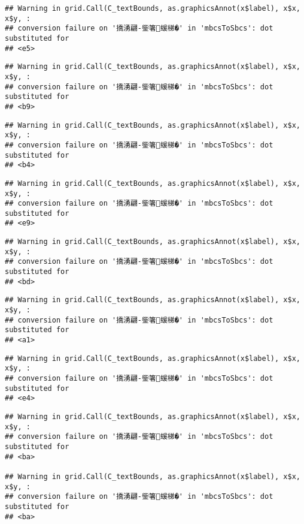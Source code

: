 \documentclass[
]{article}
\begin{document}
\begin{verbatim}
## Warning in grid.Call(C_textBounds, as.graphicsAnnot(x$label), x$x, x$y, :
## conversion failure on '撟湧翩-鈭箸蝯梯�' in 'mbcsToSbcs': dot substituted for
## <e5>
\end{verbatim}

\begin{verbatim}
## Warning in grid.Call(C_textBounds, as.graphicsAnnot(x$label), x$x, x$y, :
## conversion failure on '撟湧翩-鈭箸蝯梯�' in 'mbcsToSbcs': dot substituted for
## <b9>
\end{verbatim}

\begin{verbatim}
## Warning in grid.Call(C_textBounds, as.graphicsAnnot(x$label), x$x, x$y, :
## conversion failure on '撟湧翩-鈭箸蝯梯�' in 'mbcsToSbcs': dot substituted for
## <b4>
\end{verbatim}

\begin{verbatim}
## Warning in grid.Call(C_textBounds, as.graphicsAnnot(x$label), x$x, x$y, :
## conversion failure on '撟湧翩-鈭箸蝯梯�' in 'mbcsToSbcs': dot substituted for
## <e9>
\end{verbatim}

\begin{verbatim}
## Warning in grid.Call(C_textBounds, as.graphicsAnnot(x$label), x$x, x$y, :
## conversion failure on '撟湧翩-鈭箸蝯梯�' in 'mbcsToSbcs': dot substituted for
## <bd>
\end{verbatim}

\begin{verbatim}
## Warning in grid.Call(C_textBounds, as.graphicsAnnot(x$label), x$x, x$y, :
## conversion failure on '撟湧翩-鈭箸蝯梯�' in 'mbcsToSbcs': dot substituted for
## <a1>
\end{verbatim}

\begin{verbatim}
## Warning in grid.Call(C_textBounds, as.graphicsAnnot(x$label), x$x, x$y, :
## conversion failure on '撟湧翩-鈭箸蝯梯�' in 'mbcsToSbcs': dot substituted for
## <e4>
\end{verbatim}

\begin{verbatim}
## Warning in grid.Call(C_textBounds, as.graphicsAnnot(x$label), x$x, x$y, :
## conversion failure on '撟湧翩-鈭箸蝯梯�' in 'mbcsToSbcs': dot substituted for
## <ba>

## Warning in grid.Call(C_textBounds, as.graphicsAnnot(x$label), x$x, x$y, :
## conversion failure on '撟湧翩-鈭箸蝯梯�' in 'mbcsToSbcs': dot substituted for
## <ba>
\end{verbatim}
\end{document}
